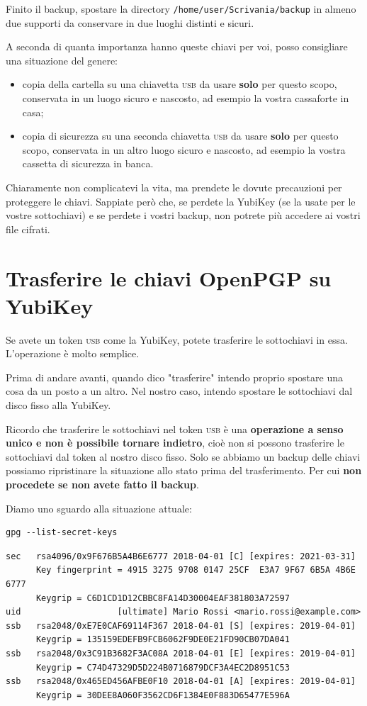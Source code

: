\documentclass[a4paper,10pt]{article}
\begin{document}
Finito il backup, spostare la directory \texttt{/home/user/Scrivania/backup} in almeno due supporti da conservare in due luoghi distinti e sicuri.

A seconda di quanta importanza hanno queste chiavi per voi, posso consigliare una situazione del genere:

\begin{itemize}
 \item copia della cartella su una chiavetta \textsc{usb} da usare \textbf{solo} per questo scopo, conservata in un luogo sicuro e nascosto, ad esempio la vostra cassaforte in casa;
 \item copia di sicurezza su una seconda chiavetta \textsc{usb} da usare \textbf{solo} per questo scopo, conservata in un altro luogo sicuro e nascosto, ad esempio la vostra cassetta di sicurezza in banca.
\end{itemize}

Chiaramente non complicatevi la vita, ma prendete le dovute precauzioni per proteggere le chiavi. Sappiate però che, se perdete la YubiKey (se la usate per le vostre sottochiavi) e se perdete i vostri backup, non potrete più accedere ai vostri file cifrati.

\section{Trasferire le chiavi OpenPGP su YubiKey}

Se avete un token \textsc{usb} come la YubiKey, potete trasferire le sottochiavi in essa. L'operazione è molto semplice.

Prima di andare avanti, quando dico "trasferire" intendo proprio spostare una cosa da un posto a un altro. Nel nostro caso, intendo spostare le sottochiavi dal disco fisso alla YubiKey.

Ricordo che trasferire le sottochiavi nel token \textsc{usb} è una \textbf{operazione a senso unico e non è possibile tornare indietro}, cioè non si possono trasferire le sottochiavi dal token al nostro disco fisso. Solo se abbiamo un backup delle chiavi possiamo ripristinare la situazione allo stato prima del trasferimento. Per cui \textbf{non procedete se non avete fatto il backup}.

Diamo uno sguardo alla situazione attuale:

\begin{lstlisting}
gpg --list-secret-keys
\end{lstlisting}

\begin{lstlisting}
sec   rsa4096/0x9F676B5A4B6E6777 2018-04-01 [C] [expires: 2021-03-31]
      Key fingerprint = 4915 3275 9708 0147 25CF  E3A7 9F67 6B5A 4B6E 6777
      Keygrip = C6D1CD1D12CBBC8FA14D30004EAF381803A72597
uid                   [ultimate] Mario Rossi <mario.rossi@example.com>
ssb   rsa2048/0xE7E0CAF69114F367 2018-04-01 [S] [expires: 2019-04-01]
      Keygrip = 135159EDEFB9FCB6062F9DE0E21FD90CB07DA041
ssb   rsa2048/0x3C91B3682F3AC08A 2018-04-01 [E] [expires: 2019-04-01]
      Keygrip = C74D47329D5D224B0716879DCF3A4EC2D8951C53
ssb   rsa2048/0x465ED456AFBE0F10 2018-04-01 [A] [expires: 2019-04-01]
      Keygrip = 30DEE8A060F3562CD6F1384E0F883D65477E596A
\end{lstlisting}
\end{document}
